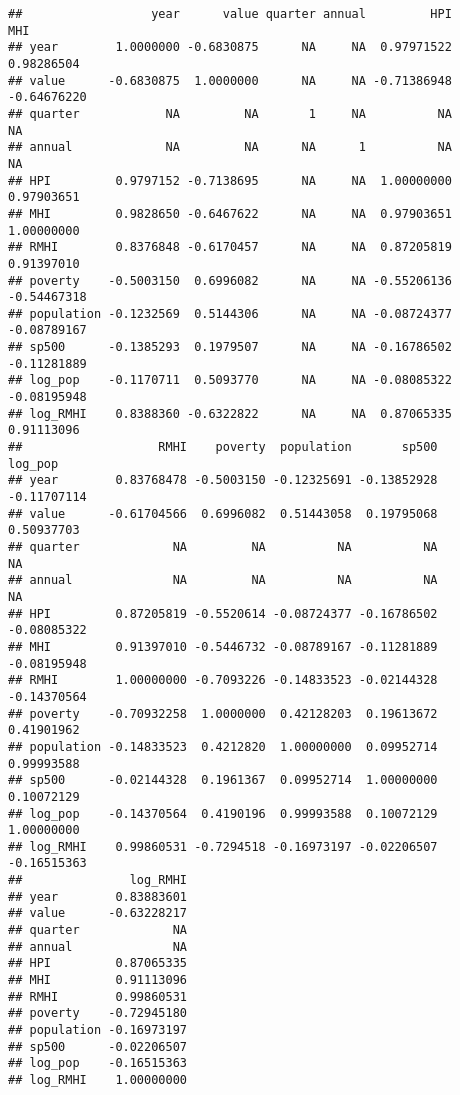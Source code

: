 \documentclass[
]{article}
\newenvironment{Shaded}{\begin{snugshade}}{\end{snugshade}}
\newcommand{\DataTypeTok}[1]{\textcolor[rgb]{0.13,0.29,0.53}{#1}}
\newcommand{\DecValTok}[1]{\textcolor[rgb]{0.00,0.00,0.81}{#1}}
\newcommand{\KeywordTok}[1]{\textcolor[rgb]{0.13,0.29,0.53}{\textbf{#1}}}
\newcommand{\NormalTok}[1]{#1}
\newcommand{\OperatorTok}[1]{\textcolor[rgb]{0.81,0.36,0.00}{\textbf{#1}}}
\newcommand{\StringTok}[1]{\textcolor[rgb]{0.31,0.60,0.02}{#1}}
\begin{document}
\begin{verbatim}
##                  year      value quarter annual         HPI         MHI
## year        1.0000000 -0.6830875      NA     NA  0.97971522  0.98286504
## value      -0.6830875  1.0000000      NA     NA -0.71386948 -0.64676220
## quarter            NA         NA       1     NA          NA          NA
## annual             NA         NA      NA      1          NA          NA
## HPI         0.9797152 -0.7138695      NA     NA  1.00000000  0.97903651
## MHI         0.9828650 -0.6467622      NA     NA  0.97903651  1.00000000
## RMHI        0.8376848 -0.6170457      NA     NA  0.87205819  0.91397010
## poverty    -0.5003150  0.6996082      NA     NA -0.55206136 -0.54467318
## population -0.1232569  0.5144306      NA     NA -0.08724377 -0.08789167
## sp500      -0.1385293  0.1979507      NA     NA -0.16786502 -0.11281889
## log_pop    -0.1170711  0.5093770      NA     NA -0.08085322 -0.08195948
## log_RMHI    0.8388360 -0.6322822      NA     NA  0.87065335  0.91113096
##                   RMHI    poverty  population       sp500     log_pop
## year        0.83768478 -0.5003150 -0.12325691 -0.13852928 -0.11707114
## value      -0.61704566  0.6996082  0.51443058  0.19795068  0.50937703
## quarter             NA         NA          NA          NA          NA
## annual              NA         NA          NA          NA          NA
## HPI         0.87205819 -0.5520614 -0.08724377 -0.16786502 -0.08085322
## MHI         0.91397010 -0.5446732 -0.08789167 -0.11281889 -0.08195948
## RMHI        1.00000000 -0.7093226 -0.14833523 -0.02144328 -0.14370564
## poverty    -0.70932258  1.0000000  0.42128203  0.19613672  0.41901962
## population -0.14833523  0.4212820  1.00000000  0.09952714  0.99993588
## sp500      -0.02144328  0.1961367  0.09952714  1.00000000  0.10072129
## log_pop    -0.14370564  0.4190196  0.99993588  0.10072129  1.00000000
## log_RMHI    0.99860531 -0.7294518 -0.16973197 -0.02206507 -0.16515363
##               log_RMHI
## year        0.83883601
## value      -0.63228217
## quarter             NA
## annual              NA
## HPI         0.87065335
## MHI         0.91113096
## RMHI        0.99860531
## poverty    -0.72945180
## population -0.16973197
## sp500      -0.02206507
## log_pop    -0.16515363
## log_RMHI    1.00000000
\end{verbatim}

\begin{Shaded}
\end{Shaded}
\end{document}
